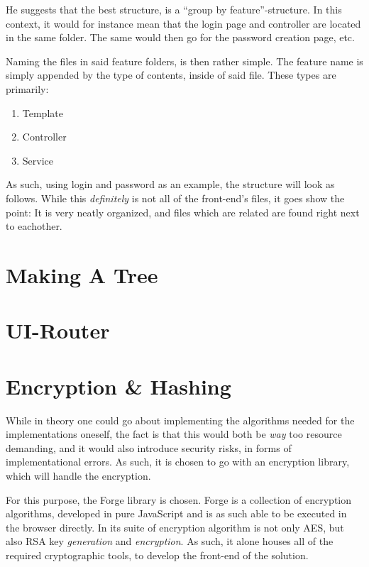 		He suggests that the best structure, is a ``group by feature''-structure. In this context, it would for instance mean that the login page and controller are located in the same folder. The same would then go for the password creation page, etc.

		Naming the files in said feature folders, is then rather simple. The feature name is simply appended by the type of contents, inside of said file. These types are primarily:
		\begin{enumerate}
			\item Template
			\item Controller
			\item Service
		\end{enumerate}
		As such, using login and password as an example, the structure will look as follows. While this \emph{definitely} is not all of the front-end's files, it goes show the point: It is very neatly organized, and files which are related are found right next to eachother.


	\section{Making A Tree}

	\section{UI-Router}
		\label{sec:impl:ui-router}

	\section{Encryption \& Hashing}
		While in theory one could go about implementing the algorithms needed for the implementations oneself, the fact is that this would both be \emph{way} too resource demanding, and it would also introduce security risks, in forms of implementational errors. As such, it is chosen to go with an encryption library, which will handle the encryption.

		For this purpose, the Forge library is chosen\cite{forge-encryption}. Forge is a collection of encryption algorithms, developed in pure JavaScript and is as such able to be executed in the browser directly. In its suite of encryption algorithm is not only AES, but also RSA key \emph{generation} and \emph{encryption}. As such, it alone houses all of the required cryptographic tools, to develop the front-end of the solution.

